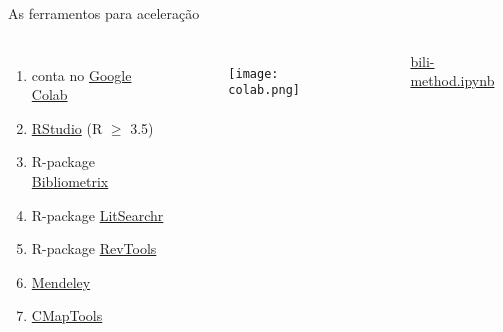 \begin{frame}[t]{As ferramentos para aceleração} 
    \transdissolve[duration=0.5]



        \begin{columns}[t]
                \begin{enumerate}
                    \item conta no \href{https://colab.research.google.com/}{Google Colab}
                    \item \href{https://www.rstudio.com/products/rstudio/}{RStudio} (R $\geq$ 3.5)
                    \item R-package \href{https://www.bibliometrix.org/}{Bibliometrix}
                    \item R-package \href{https://elizagrames.github.io/litsearchr/}{LitSearchr}
                    \item R-package \href{https://revtools.net/}{RevTools}
                    \item \href{https://www.mendeley.com/?interaction_required=true}{Mendeley}
                    \item \href{https://cmap.ihmc.us/}{CMapTools}
                \end{enumerate}
                \centering
                \begin{figure}
                         \texttt{[image: colab.png]}
                \end{figure}
                \href{https://colab.research.google.com/drive/1DP0-hgr_tXYGTs2M-9NrsMy8NsUi1hwt?usp=sharing}{bili-method.ipynb}

                
        
        \end{columns}
\end{frame}
